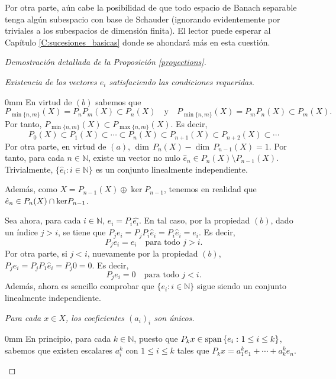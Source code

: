 	Por otra parte, aún cabe la posibilidad de que todo espacio de Banach separable tenga algún subespacio con base de Schauder (ignorando evidentemente por triviales a los subespacios de dimensión finita). El lector puede esperar al Capítulo \ref{C:sucesiones_basicas} donde se ahondará más en esta cuestión.
	
	
	\begin{proof}[Demostración detallada de la Proposición \ref{proyections}]\label{D:proyecciones}
		
		\noindent\emph{Existencia de los vectores $e_i$ satisfaciendo las condiciones requeridas}.
		
		\begin{addmargin}[5mm]{0mm}
			En virtud de $(b)$ sabemos que
			\[P_{\min\{n,m\}}(X)=P_nP_m(X) \subset P_n(X)\quad\text{y}\quad P_{\min\{n,m\}}(X)=P_mP_n(X)\subset P_m(X).\]
			Por tanto, $P_{\min\{n,m\}}(X) \subset P_{\max\{n,m\}}(X)$. Es decir,
			\[P_0(X) \subset P_1(X) \subset \cdots \subset P_n(X) \subset P_{n+1}(X) \subset P_{n+2}(X) \subset \cdots\]
			Por otra parte, en virtud de $(a)$, $\dim\,P_n(X)-\dim\,P_{n-1}(X)=1$. Por tanto, para cada $n\in\mathbb{N}$, existe un vector no nulo $\hat{e}_n\in P_n(X)\setminus P_{n-1}(X)$. Trivialmente, $\{\hat{e}_i\colon i\in\mathbb{N}\}$ es un conjunto linealmente independiente.
			
			Además, como $X=P_{n-1}(X)\oplus{\ker P_{n-1}}$, tenemos en realidad que $\hat{e}_n\in P_n(X)\cap {\rm ker}P_{n-1}$.
			
			Sea ahora, para cada $i\in\mathbb{N}$, $e_i=P_i\hat{e_i}$. En tal caso, por la propiedad $(b)$, dado un índice $j>i$, se tiene que $P_je_i=P_jP_i\hat{e}_i=P_i\hat{e}_i=e_i$. Es decir,
			\begin{equation}\label{eq:3}
				P_je_i=e_i\quad\text{para todo $j>i$.}    
			\end{equation}
			Por otra parte, si $j<i$, nuevamente por la propiedad $(b)$, $P_je_i=P_jP_1\hat{e}_i=P_j0=0$. Es decir,
			\begin{equation}\label{eq:4}
				P_je_i=0\quad\text{para todo $j<i$.}    
			\end{equation}
			Además, ahora es sencillo comprobar que $\{e_i\colon i\in\mathbb{N}\}$ sigue siendo un conjunto linealmente independiente.
		\end{addmargin}
		
		\noindent\emph{Para cada $x\in X$, los coeficientes $(a_i)_i$ son únicos.}
		\begin{addmargin}[5mm]{0mm}
			En principio, para cada $k\in\mathbb{N}$, puesto que $P_kx\in{\rm span}\,\{e_i\, \colon 1\leq i\leq k\}$, sabemos que existen escalares $a^k_i$ con $1\leq i\leq k$ tales que $P_kx=a_1^ke_1+\cdots +a_k^k e_n$. 
			

\end{addmargin}
\end{proof}
